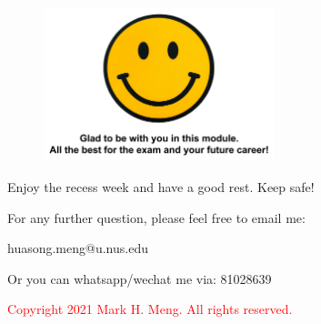 \begin{frame}{}
	\begin{figure}
		\includegraphics[width=0.6\textwidth, trim=0 3.5cm 0 0, clip]{t5/images/final.png}
	\end{figure}
\begin{center}
	Enjoy the recess week and have a good rest. Keep safe!
\end{center} 
\end{frame}

\begin{frame}{}
	\centering  
	For any further question, please feel free to email me:\vspace{10pt}
	
	huasong.meng@u.nus.edu\\\vspace{3pt}
	
	Or you can whatsapp/wechat me via: 81028639 \vspace{20pt}
	
	\begin{tcolorbox}
		\begin{center}
			\textcolor{red}{Copyright 2021 Mark H. Meng. All rights reserved.}
		\end{center}
	\end{tcolorbox}
\end{frame}